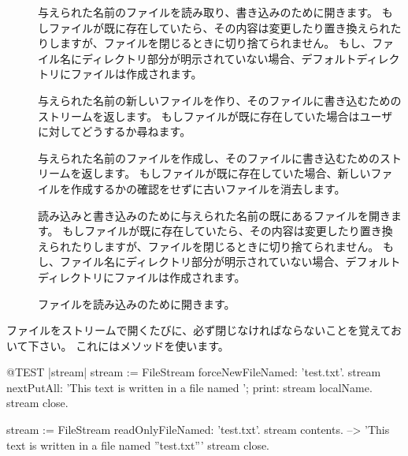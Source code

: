 \documentclass[a4paper,10pt,twoside]{book}
\begin{document}
\begin{description}

\item[] 与えられた名前のファイルを読み取り、書き込みのために開きます。
  もしファイルが既に存在していたら、その内容は変更したり置き換えられたりしますが、ファイルを閉じるときに切り捨てられません。
  もし、ファイル名にディレクトリ部分が明示されていない場合、デフォルトディレクトリにファイルは作成されます。
  
\item[] 与えられた名前の新しいファイルを作り、そのファイルに書き込むためのストリームを返します。
  もしファイルが既に存在していた場合はユーザに対してどうするか尋ねます。
  
\item[] 与えられた名前のファイルを作成し、そのファイルに書き込むためのストリームを返します。
  もしファイルが既に存在していた場合、新しいファイルを作成するかの確認をせずに古いファイルを消去します。

\item[] 読み込みと書き込みのために与えられた名前の既にあるファイルを開きます。
  もしファイルが既に存在していたら、その内容は変更したり置き換えられたりしますが、ファイルを閉じるときに切り捨てられません。
  もし、ファイル名にディレクトリ部分が明示されていない場合、デフォルトディレクトリにファイルは作成されます。

\item[] ファイルを読み込みのために開きます。

\end{description}

ファイルをストリームで開くたびに、必ず閉じなければならないことを覚えておいて下さい。
これにはメソッドを使います。


\begin{code}{@TEST |stream|}
stream := FileStream forceNewFileNamed: 'test.txt'.
stream
    nextPutAll: 'This text is written in a file named ';
    print: stream localName.
stream close.

stream := FileStream readOnlyFileNamed: 'test.txt'.
stream contents. --> 'This text is written in a file named ''test.txt'''
stream close.
\end{code}
\end{document}
